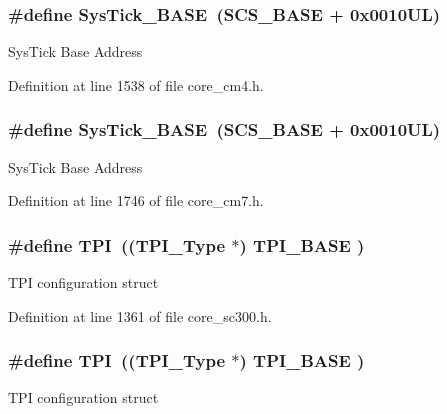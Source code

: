 \subsubsection[{\texorpdfstring{Sys\+Tick\+\_\+\+B\+A\+SE}{SysTick_BASE}}]{\setlength{\rightskip}{0pt plus 5cm}\#define Sys\+Tick\+\_\+\+B\+A\+SE~({\bf S\+C\+S\+\_\+\+B\+A\+SE} +  0x0010\+U\+L)}\hypertarget{group___c_m_s_i_s__core__base_ga58effaac0b93006b756d33209e814646}{}\label{group___c_m_s_i_s__core__base_ga58effaac0b93006b756d33209e814646}
Sys\+Tick Base Address 

Definition at line 1538 of file core\+\_\+cm4.\+h.

\subsubsection[{\texorpdfstring{Sys\+Tick\+\_\+\+B\+A\+SE}{SysTick_BASE}}]{\setlength{\rightskip}{0pt plus 5cm}\#define Sys\+Tick\+\_\+\+B\+A\+SE~({\bf S\+C\+S\+\_\+\+B\+A\+SE} +  0x0010\+U\+L)}\hypertarget{group___c_m_s_i_s__core__base_ga58effaac0b93006b756d33209e814646}{}\label{group___c_m_s_i_s__core__base_ga58effaac0b93006b756d33209e814646}
Sys\+Tick Base Address 

Definition at line 1746 of file core\+\_\+cm7.\+h.

\subsubsection[{\texorpdfstring{T\+PI}{TPI}}]{\setlength{\rightskip}{0pt plus 5cm}\#define T\+PI~(({\bf T\+P\+I\+\_\+\+Type}       $\ast$)     {\bf T\+P\+I\+\_\+\+B\+A\+SE}      )}\hypertarget{group___c_m_s_i_s__core__base_ga8b4dd00016aed25a0ea54e9a9acd1239}{}\label{group___c_m_s_i_s__core__base_ga8b4dd00016aed25a0ea54e9a9acd1239}
T\+PI configuration struct 

Definition at line 1361 of file core\+\_\+sc300.\+h.

\subsubsection[{\texorpdfstring{T\+PI}{TPI}}]{\setlength{\rightskip}{0pt plus 5cm}\#define T\+PI~(({\bf T\+P\+I\+\_\+\+Type}       $\ast$)     {\bf T\+P\+I\+\_\+\+B\+A\+SE}      )}\hypertarget{group___c_m_s_i_s__core__base_ga8b4dd00016aed25a0ea54e9a9acd1239}{}\label{group___c_m_s_i_s__core__base_ga8b4dd00016aed25a0ea54e9a9acd1239}
T\+PI configuration struct 

